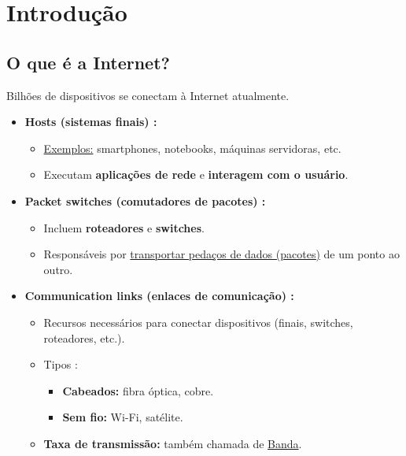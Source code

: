 \section{Introdução}

    \subsection{O que é a Internet?}

    Bilhões de dispositivos se conectam à Internet atualmente.

    \begin{itemize}[left=0.5cm, align=left, nosep]
        
        \item \textbf{Hosts (sistemas finais) :}  
        \begin{itemize}[left=0.5cm, nosep, label=$\hookrightarrow$]
            \item \underline{Exemplos:} smartphones, notebooks, máquinas servidoras, etc.
            \item Executam \textbf{aplicações de rede} e \textbf{interagem com o usuário}.
        \end{itemize}           
        
        \item \textbf{Packet switches (comutadores de pacotes) :}          
        \begin{itemize}[left=0.5cm, nosep, label=$\hookrightarrow$]
            \item Incluem \textbf{roteadores} e \textbf{switches}.
            \item Responsáveis por \underline{transportar pedaços de dados (pacotes)} de um ponto ao outro.
        \end{itemize}     
        
        \item \textbf{Communication links (enlaces de comunicação) :} 
        \begin{itemize}[left=0.5cm, nosep, label=$\hookrightarrow$]
            \item Recursos necessários para conectar dispositivos (finais, switches, roteadores, etc.).   
            \item Tipos : 
            \begin{itemize}[left=0.5cm, nosep, label=$-$]
                \item \textbf{Cabeados:} fibra óptica, cobre.  
                \item \textbf{Sem fio:} Wi-Fi, satélite.
            \end{itemize}
            \item \textbf{Taxa de transmissão:} também chamada de \underline{Banda}.
        \end{itemize}  
        

\end{itemize}
